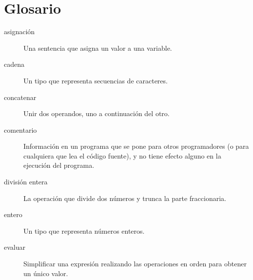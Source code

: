 \hypertarget{glosario}{%
\section*{Glosario}\label{glosario}}

\begin{description}
\item[asignación]
Una sentencia que asigna un valor a una variable.
\end{description}


\begin{description}
\item[cadena]
Un tipo que representa secuencias de caracteres.
\end{description}


\begin{description}
\item[concatenar]
Unir dos operandos, uno a continuación del otro.
\end{description}


\begin{description}
\item[comentario]
Información en un programa que se pone para otros programadores (o para
cualquiera que lea el código fuente), y no tiene efecto alguno en la
ejecución del programa.
\end{description}


\begin{description}
\item[división entera]
La operación que divide dos números y trunca la parte fraccionaria.
\end{description}


\begin{description}
\item[entero]
Un tipo que representa números enteros.
\end{description}


\begin{description}
\item[evaluar]
Simplificar una expresión realizando las operaciones en orden para
obtener un único valor.
\end{description}

